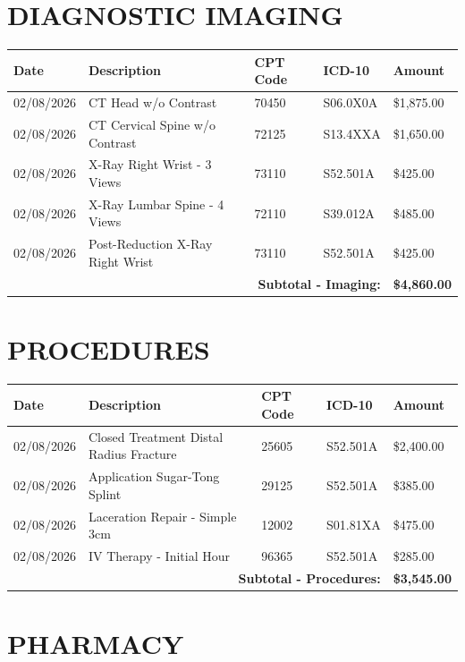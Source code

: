 \documentclass[11pt]{article}
\begin{document}
\section*{DIAGNOSTIC IMAGING}

\begin{longtable}{@{}p{2cm}p{6cm}p{2cm}p{2cm}p{2.5cm}@{}}
\toprule
\textbf{Date} & \textbf{Description} & \textbf{CPT Code} & \textbf{ICD-10} & \textbf{Amount} \\
\midrule
\endhead

02/08/2026 & CT Head w/o Contrast & 70450 & S06.0X0A & \$1,875.00 \\
02/08/2026 & CT Cervical Spine w/o Contrast & 72125 & S13.4XXA & \$1,650.00 \\
02/08/2026 & X-Ray Right Wrist - 3 Views & 73110 & S52.501A & \$425.00 \\
02/08/2026 & X-Ray Lumbar Spine - 4 Views & 72110 & S39.012A & \$485.00 \\
02/08/2026 & Post-Reduction X-Ray Right Wrist & 73110 & S52.501A & \$425.00 \\
\midrule
\multicolumn{4}{r}{\textbf{Subtotal - Imaging:}} & \textbf{\$4,860.00} \\
\bottomrule
\end{longtable}

\section*{PROCEDURES}

\begin{longtable}{@{}p{2cm}p{6cm}p{2cm}p{2cm}p{2.5cm}@{}}
\toprule
\textbf{Date} & \textbf{Description} & \textbf{CPT Code} & \textbf{ICD-10} & \textbf{Amount} \\
\midrule
\endhead

02/08/2026 & Closed Treatment Distal Radius Fracture & 25605 & S52.501A & \$2,400.00 \\
02/08/2026 & Application Sugar-Tong Splint & 29125 & S52.501A & \$385.00 \\
02/08/2026 & Laceration Repair - Simple 3cm & 12002 & S01.81XA & \$475.00 \\
02/08/2026 & IV Therapy - Initial Hour & 96365 & S52.501A & \$285.00 \\
\midrule
\multicolumn{4}{r}{\textbf{Subtotal - Procedures:}} & \textbf{\$3,545.00} \\
\bottomrule
\end{longtable}

\section*{PHARMACY}
\end{document}
